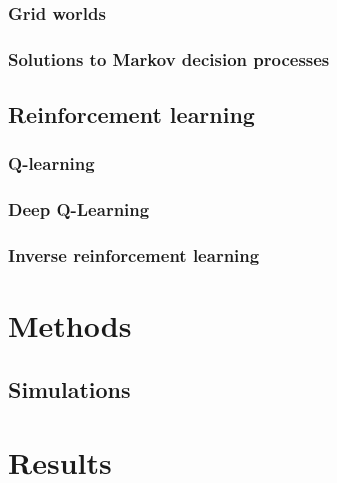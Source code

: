 \documentclass{report}
\theoremstyle{definition}
\begin{document}
\subsection{Grid worlds}

\subsection{Solutions to Markov decision processes}

\section{Reinforcement learning}

\subsection{Q-learning}

\subsection{Deep Q-Learning}

\subsection{Inverse reinforcement learning}




\chapter{Methods}

\section{Simulations}




\chapter{Results}
\end{document}
